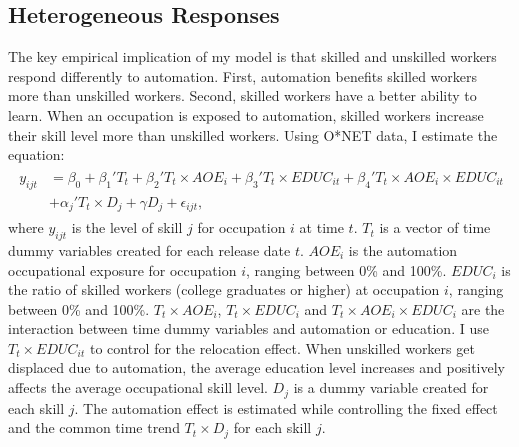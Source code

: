 \documentclass[12pt]{article}
\begin{document}
\subsection{Heterogeneous Responses}
The key empirical implication of my model is that skilled and unskilled workers respond differently to automation. First, automation benefits skilled workers more than unskilled workers. Second, skilled workers have a better ability to learn. When an occupation is exposed to automation, skilled workers increase their skill level more than unskilled workers. Using O*NET data, I estimate the equation: 
\begin{align}
\begin{split}
y_{ijt} &= \beta_0 + \beta_1' T_t +\beta_2' T_t \times AOE_{i}+\beta_3' T_t  \times EDUC_{it} +\beta_4' T_t \times AOE_{i} \times EDUC_{it}\\
         &+\alpha_j' T_t \times D_j +\gamma D_j+ \epsilon_{ijt},
\end{split}
\end{align}
where $y_{ijt}$ is the level of skill $j$ for occupation $i$ at time $t$. $T_t$ is a vector of time dummy variables created for each release date $t$. $AOE_{i}$ is the automation occupational exposure for occupation $i$, ranging between 0\% and 100\%. $EDUC_{i}$ is the ratio of skilled workers (college graduates or higher) at occupation $i$, ranging between 0\% and 100\%. $T_t \times AOE_{i}$, $T_t \times EDUC_{i}$ and $T_t \times AOE_{i}\times EDUC_{i}$ are the interaction between time dummy variables and automation or education. I use  $T_t\times EDUC_{it}$ to control for the relocation effect. When unskilled workers get displaced due to automation, the average education level increases and positively affects the average occupational skill level. $D_j$ is a dummy variable created for each skill $j$. The automation effect is estimated while controlling the fixed effect and the common time trend $T_t \times D_j$ for each skill $j$. 
\end{document}

